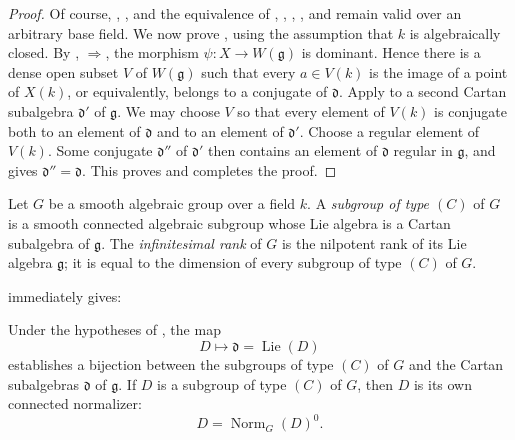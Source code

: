 \begin{proof}
Of course, , , and the equivalence of , , , , and
 remain valid over an arbitrary base field. We now prove ,
using the assumption that \(k\) is algebraically closed. By
, \(\Rightarrow\), the morphism
\(\psi:X\to W(\mathfrak g)\) is dominant. Hence there is a dense open
subset \(V\) of \(W(\mathfrak g)\) such that every \(a\in V(k)\) is
the image of a point of \(X(k)\), or equivalently, belongs to a
conjugate of \(\mathfrak d\). Apply  to a second Cartan
subalgebra \(\mathfrak d'\) of \(\mathfrak g\). We may choose \(V\)
so that every element of \(V(k)\) is conjugate both to an element of
\(\mathfrak d\) and to an element of \(\mathfrak d'\). Choose a
regular element of \(V(k)\). Some conjugate \(\mathfrak d''\) of
\(\mathfrak d'\) then contains an element of \(\mathfrak d\) regular
in \(\mathfrak g\), and  gives
\(\mathfrak d''=\mathfrak d\). This proves  and completes the proof.
\end{proof}

\begin{definition}
Let \(G\) be a smooth algebraic group over a field \(k\). A
\emph{subgroup of type \((C)\)} of \(G\) is a smooth connected
algebraic subgroup whose Lie algebra is a Cartan subalgebra of
\(\mathfrak g\). The \emph{infinitesimal rank} of \(G\) is the
nilpotent rank of its Lie algebra \(\mathfrak g\); it is equal to the
dimension of every subgroup of type \((C)\) of \(G\).
\end{definition}

 immediately gives:

\begin{corollary}
Under the hypotheses of , the map
\[
  D\longmapsto\mathfrak d=\operatorname{Lie}(D)
\]
establishes a bijection between the subgroups of type \((C)\) of
\(G\) and the Cartan subalgebras \(\mathfrak d\) of \(\mathfrak g\).
If \(D\) is a subgroup of type \((C)\) of \(G\), then \(D\) is its
own connected normalizer:
\[
  D=\operatorname{Norm}_G(D)^0.
\]
\end{corollary}

